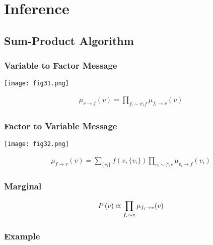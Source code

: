 \section{Inference}
\label{section11.5}

\subsection{Sum-Product Algorithm}

\subsubsection*{Variable to Factor Message}

\begin{minipage}{0.4\textwidth}
	\centering
	\texttt{[image: fig31.png]}
\end{minipage}
\begin{minipage}{0.6\textwidth}
	\begin{align*}
	\mu_{v\to f}(v)=\prod_{f_i\sim v\setminus f}\mu_{f_i\to v}(v)
	\end{align*}
\end{minipage}

\subsubsection*{Factor to Variable Message}

\begin{minipage}{0.4\textwidth}
	\centering
	\texttt{[image: fig32.png]}
\end{minipage}
\begin{minipage}{0.6\textwidth}
	\begin{align*}
	\mu_{f\to v}(v)=\sum_{\{v_i\}}f(v,\{v_i\})\prod_{v_i\sim f\setminus v}\mu_{v_i\to f}(v_i)
	\end{align*}
\end{minipage}

\subsubsection*{Marginal}

\begin{align*}
P\left(v\right)\varpropto\prod_{f_i\sim v}\mu_{f_i\to v}(v)
\end{align*}

\subsubsection*{Example}

